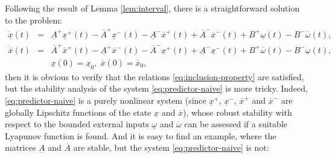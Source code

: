 Following the result of Lemma \ref{lem:interval}, there is a straightforward solution to the problem:
\begin{eqnarray}
\dot{\underline{x}}(t) & = & \underline{A}^{+}\underline{x}^{+}(t)-\overline{A}^{+}\underline{x}^{-}(t)-\underline{A}^{-}\overline{x}^{+}(t)  +\overline{A}^{-}\overline{x}^{-}(t)+B^{+}\underline{\omega}(t)-B^{-}\overline{\omega}(t),\label{eq:predictor-naive}\\
\dot{\overline{x}}(t) & = & \overline{A}^{+}\overline{x}^{+}(t)-\underline{A}^{+}\overline{x}^{-}(t)-\overline{A}^{-}\underline{x}^{+}(t) +\underline{A}^{-}\underline{x}^{-}(t)+B^{+}\overline{\omega}(t)-B^{-}\underline{\omega}(t),\nonumber \\
&  & \underline{x}(0)=\underline{x}_{0},\;\overline{x}(0)=\overline{x}_{0},\nonumber 
\end{eqnarray}
then it is obvious to verify that the relations \eqref{eq:inclusion-property} are satisfied, but the stability analysis of the system \eqref{eq:predictor-naive} is more tricky. Indeed, \eqref{eq:predictor-naive} is a purely nonlinear system (since $\underline{x}^{+}$, $\underline{x}^{-}$, $\overline{x}^{+}$ and $\overline{x}^{-}$ are globally Lipschitz functions of the state $\underline{x}$ and $\overline{x}$), whose robust stability with respect to the bounded external inputs $\underline{\omega}$ and $\overline{\omega}$ can be assessed if a suitable Lyapunov function is found. And it is easy to find an example, where the matrices $\underline{A}$ and $\overline{A}$ are stable, but the system \eqref{eq:predictor-naive} is not:

